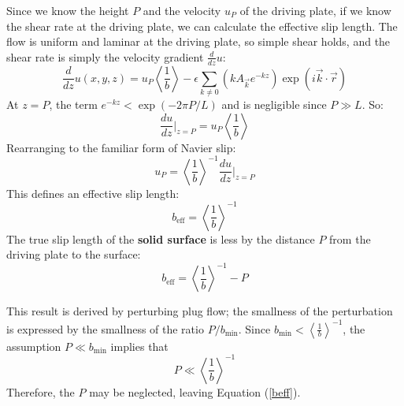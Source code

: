 \documentclass[12pt, a4paper, twoside, openright]{book}
\newcommand{\beff}{\ensuremath{b_{\mathrm{eff}}}}
\newcommand{\bmin}{\ensuremath{b_{\mathrm{min}}}}
\begin{document}
Since we know the height $P$ and the velocity $u_P$ of the driving plate, if we know the shear rate at the driving plate, we can calculate the effective slip length.
The flow is uniform and laminar at the driving plate, so simple shear holds, and the shear rate is simply the velocity gradient $\frac{d}{dz} u$:
\begin{equation}
\frac{d}{dz} u(x,y,z) = 
 u_P\left< \frac{1}{b} \right>
 - \epsilon \sum_{k \neq 0} 
\left( k A_{\vec{k}} e^{-kz} \right)
\exp(i \vec{k}\cdot \vec{r})
\end{equation}
At $z = P$, the term $e^{-kz} < \exp ( - 2 \pi P/L )$ and is negligible since $P \gg L$. So:
\begin{equation}
\frac{du}{dz} \rvert_{z=P} = u_P\left< \frac{1}{b} \right>
\end{equation}
Rearranging to the familiar form of Navier slip:
\begin{equation}
 u_P = \left< \frac{1}{b} \right>^{-1} \frac{du}{dz} \rvert_{z=P}
\end{equation}
This defines an effective slip length:
\begin{equation}
\beff = \left< \frac{1}{b} \right>^{-1}
\label{beff}
\end{equation}
The true slip length of the \textbf{solid surface} is less by the distance $P$ from the driving plate to the surface:
\begin{equation}
\beff = \left< \frac{1}{b} \right>^{-1} - P
\end{equation}

This result is derived by perturbing plug flow; the smallness of the perturbation is expressed by the smallness of the ratio $P/ \bmin$.  Since $ \bmin < \left< \frac{1}{b} \right>^{-1}$, the assumption $P \ll \bmin$ implies that
\begin{equation}
P \ll \left< \frac{1}{b} \right>^{-1}
\end{equation}
Therefore, the $P$ may be neglected, leaving Equation (\ref{beff}).


\end{document}
